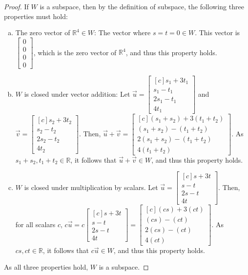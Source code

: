\documentclass[11pt]{scrartcl}
\theoremstyle{dotlessP}
\theoremstyle{dotlessN}
\newcommand{\reals}{\mathbb{R}} %
\begin{document}
\begin{proof}
	If $W$ is a subspace, then by the definition of subspace, the following three properties must hold:
	\begin{enumerate}[a.]
		\item The zero vector of $\reals^4 \in W$: The vector where $s = t = 0 \in W$. This vector is $
\begin{bmatrix}
	0 \\
	0 \\
	0 \\
	0
\end{bmatrix}
			$, which is the zero vector of $\reals^4$, and thus this property holds.
		\item $W$ is closed under vector addition: Let $\vec{u} = 
			\begin{bmatrix}[c]
	s_1 + 3t_1 \\
	s_1 - t_1 \\
	2s_1 - t_1 \\
	4t_1
\end{bmatrix}
$ and $\vec{v} = 
\begin{bmatrix}[c]
	s_2 + 3t_2 \\
	s_2 - t_2 \\
	2s_2 - t_2 \\
	4t_2
\end{bmatrix}
$. Then, $\vec{u} + \vec{v} =
\begin{bmatrix}[c]
	(s_1 + s_2) + 3(t_1 + t_2) \\
	(s_1 + s_2) - (t_1 + t_2) \\
	2(s_1 + s_2) - (t_1 + t_2) \\
	4(t_1 + t_2)
\end{bmatrix}
$. As $s_1 + s_2, t_1 + t_2 \in \reals$, it follows that $\vec{u} + \vec{v} \in W$, and thus this property holds.
\item $W$ is closed under multiplication by scalars. Let $\vec{u} = 
	\begin{bmatrix}[c]
	s + 3t \\
	s - t \\
	2s - t \\
	4t
\end{bmatrix}
$. Then, for all scalars $c$, $c\vec{u} = 
c
\begin{bmatrix}[c]
	s + 3t \\
	s - t \\
	2s - t \\
	4t
\end{bmatrix} = 
\begin{bmatrix}[c]
	(cs) + 3(ct) \\
	(cs) - (ct) \\
	2(cs) - (ct) \\
4(ct) 
\end{bmatrix}
$. As $cs, ct \in \reals$, it follows that $c\vec{u} \in W$, and thus this property holds.
	\end{enumerate}
	As all three properties hold, $W$ is a subspace.
\end{proof}
\end{document}
